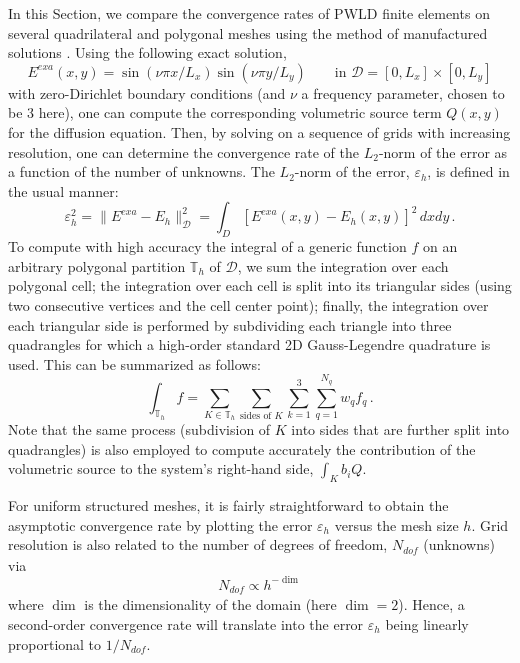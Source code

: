 \documentclass[preprint,10pt]{elsarticle}
\newcommand{\D}{\mathcal{D}}
\newcommand{\tf}{b}
\begin{document}
In this Section, we compare the convergence rates of PWLD finite elements on several quadrilateral
and polygonal meshes using the method of manufactured solutions \cite{mms}. Using the following exact solution,
\begin{equation}
	E^{\textit{exa}}(x,y) = \sin(\nu \pi x/L_x) \sin(\nu\pi y/L_y) \qquad \text{in } \D=[0,L_x]\times [0,L_y]
\end{equation}
with zero-Dirichlet boundary conditions (and $\nu$ a frequency parameter, chosen to be 3 here), one can compute 
the corresponding volumetric source term $Q(x,y)$ for the diffusion equation. Then, by solving on a sequence of
grids with increasing resolution, one can determine the convergence rate of the $L_2$-norm of the error
as a function of the number of unknowns. The $L_2$-norm of the error, $\varepsilon_h$, is defined in the usual manner:
\begin{equation}
	\varepsilon_h^2 = \| E^{\textit{exa}} - E_h \|^2_\D = \int_D \left[ E^{\textit{exa}}(x,y)  - E_h(x,y) \right]^2 \, dxdy	\, .
\end{equation}
To compute with high accuracy the integral of a generic function $f$ on an arbitrary polygonal partition $\mathbb{T}_h$ of $\D$, we sum the integration over each polygonal cell; the integration over each cell is split into its triangular sides (using two consecutive vertices and the cell center point); finally, the integration over each triangular side is performed by subdividing each triangle into three quadrangles for which a high-order standard 2D Gauss-Legendre quadrature is used. This can be summarized as follows:
\begin{equation}
	\int_{\mathbb{T}_h} f  = \sum_{K\in \mathbb{T}_h} \sum_{\text{sides of }K} \sum_{k=1}^3 
	\sum_{q=1}^{N_q} w_q f_q
	\, .
\end{equation}
Note that the same process (subdivision of $K$ into sides that are further split into quadrangles) is also employed to compute accurately the contribution of the volumetric source to the system's right-hand side, $\int_K \tf_i Q$.

For uniform structured meshes, it is fairly straightforward to obtain the asymptotic convergence rate by plotting the error $\varepsilon_h$ versus the mesh size $h$. Grid resolution is also related to the number of degrees of freedom, $N_\textit{dof}$ (unknowns) via 
\begin{equation}
N_{\textit{dof}} \propto  h ^{-\dim} 
\end{equation}
where $\dim$ is the dimensionality of the domain (here $\dim = 2$). Hence, a second-order convergence rate will translate into the error $\varepsilon_h$ being linearly proportional to $1/N_{\textit{dof}}$.
\end{document}

